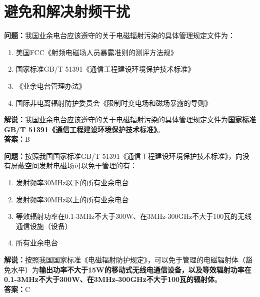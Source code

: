 \chapter{避免和解决射频干扰}


\noindent\textbf{问题：}我国业余电台应该遵守的关于电磁辐射污染的具体管理规定文件为： 
\begin{enumerate}[label=\Alph*), leftmargin=3em]
\item 美国FCC《射频电磁场人员暴露准则的测评方法规》
\item 国家标准GB/T 51391《通信工程建设环境保护技术标准》
\item 《业余电台管理办法》
\item 国际非电离辐射防护委员会《限制时变电场和磁场暴露的导则》
\end{enumerate}
\noindent\textbf{解说：}我国业余电台应该遵守的关于电磁辐射污染的具体管理规定文件为\textbf{国家标准GB/T 51391《通信工程建设环境保护技术标准》}。\\\textbf{答案：}B



\bigskip


\noindent\textbf{问题：}按照我国国家标准GB/T 51391《通信工程建设环境保护技术标准》，向没有屏蔽空间发射电磁场可以免于管理的有： 
\begin{enumerate}[label=\Alph*), leftmargin=3em]
\item 发射频率30MHz以下的所有业余电台
\item 发射频率30MHz以上的所有业余电台
\item 等效辐射功率在0.1-3MHz不大于300W、在3MHz-300GHz不大于100瓦的无线通信设施（设备） 
\item 所有业余电台
\end{enumerate}
\noindent\textbf{解说：}按照我国国家标准《电磁辐射防护规定》，可以免于管理的电磁辐射体（豁免水平）为\textbf{输出功率不大于15W的移动式无线电通信设备，以及等效辐射功率在0.1-3MHz不大于300W、在3MHz-300GHz不大于100瓦的辐射体}。\\\textbf{答案：}C



\bigskip


%
%


